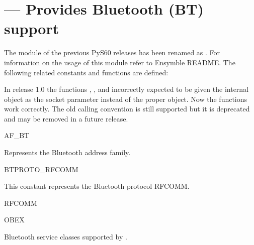 %
%
%

\section{ ---
  Provides Bluetooth (BT) support} 

\label{sec:btsocket}

The  module of the previous PyS60 releases has been renamed as 
. For information on the usage of this module refer to 
Ensymble README. The following related constants and functions are defined:

\begin{notice}[note]
In release 1.0 the functions , 
, and 
 incorrectly 
expected to be given the internal  object as the 
socket parameter instead of the proper  object. Now the 
functions work correctly. The old calling convention is still supported but 
it is deprecated and may be removed in a future release.
\end{notice}

\begin{datadesc}{AF_BT}

Represents the Bluetooth address family.

\end{datadesc}

\begin{datadesc}{BTPROTO_RFCOMM}

This constant represents the Bluetooth protocol RFCOMM.

\end{datadesc}

\begin{datadesc}{RFCOMM}
\end{datadesc}
\begin{datadesc}{OBEX}

Bluetooth service classes supported by .

\end{datadesc}

